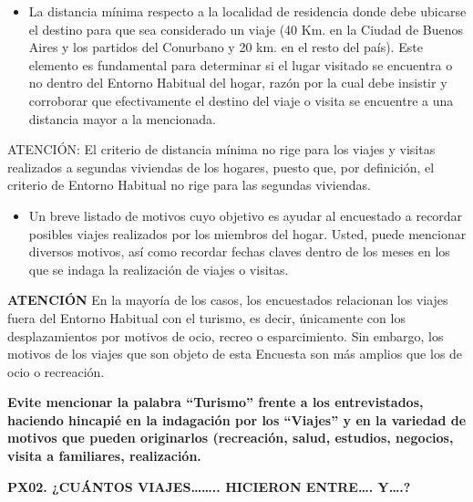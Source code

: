 \documentclass[
  openany]{book}
\providecommand{\tightlist}{%
  \setlength{\itemsep}{0pt}\setlength{\parskip}{0pt}}
\begin{document}
\begin{itemize}
\tightlist
\item
  La distancia mínima respecto a la localidad de residencia donde debe ubicarse el destino para que sea considerado un viaje (40 Km. en la Ciudad de Buenos Aires y los partidos del Conurbano y 20 km. en el resto del país). Este elemento es fundamental para determinar si el lugar visitado se encuentra o no dentro del Entorno Habitual del hogar, razón por la cual debe insistir y corroborar que efectivamente el destino del viaje o visita se encuentre a una distancia mayor a la mencionada.
\end{itemize}

ATENCIÓN: El criterio de distancia mínima no rige para los viajes y visitas realizados a segundas viviendas de los hogares, puesto que, por definición, el criterio de Entorno Habitual no rige para las segundas viviendas.

\begin{itemize}
\tightlist
\item
  Un breve listado de motivos cuyo objetivo es ayudar al encuestado a recordar posibles viajes realizados por los miembros del hogar. Usted, puede mencionar diversos motivos, así como recordar fechas claves dentro de los meses en los que se indaga la realización de viajes o visitas.
\end{itemize}

\textbf{ATENCIÓN} En la mayoría de los casos, los encuestados relacionan los viajes fuera del Entorno Habitual con el turismo, es decir, únicamente con los desplazamientos por motivos de ocio, recreo o esparcimiento. Sin embargo, los motivos de los viajes que son objeto de esta Encuesta son más amplios que los de ocio o recreación.

\textbf{Evite mencionar la palabra ``Turismo'' frente a los entrevistados, haciendo hincapié en la indagación por los ``Viajes'' y en la variedad de motivos que pueden originarlos (recreación, salud, estudios, negocios, visita a familiares, realización.}

\textbf{PX02. ¿CUÁNTOS VIAJES\ldots\ldots.. HICIERON ENTRE\ldots. Y\ldots.?}
\end{document}
